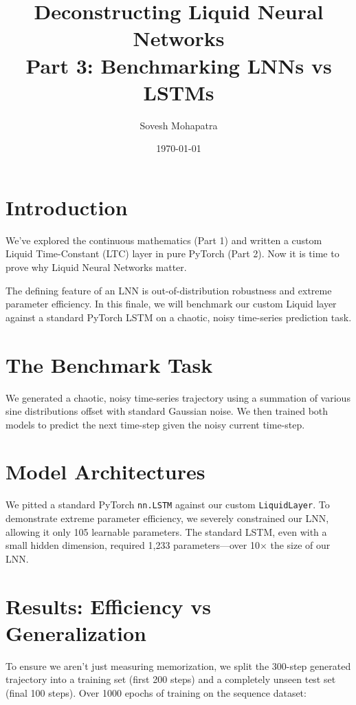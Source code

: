 \documentclass[12pt]{article}
\title{\textbf{Deconstructing Liquid Neural Networks \\ Part 3: Benchmarking LNNs vs LSTMs}}
\author{Sovesh Mohapatra}
\date{\today}
\begin{document}
\maketitle

\section*{Introduction}
We’ve explored the continuous mathematics (Part 1) and written a custom Liquid Time-Constant (LTC) layer in pure PyTorch (Part 2). Now it is time to prove why Liquid Neural Networks matter.

The defining feature of an LNN is out-of-distribution robustness and extreme parameter efficiency. In this finale, we will benchmark our custom Liquid layer against a standard PyTorch LSTM on a chaotic, noisy time-series prediction task.

\section*{The Benchmark Task}
We generated a chaotic, noisy time-series trajectory using a summation of various sine distributions offset with standard Gaussian noise. We then trained both models to predict the next time-step given the noisy current time-step.

\section*{Model Architectures}
We pitted a standard PyTorch \texttt{nn.LSTM} against our custom \texttt{LiquidLayer}. To demonstrate extreme parameter efficiency, we severely constrained our LNN, allowing it only 105 learnable parameters. The standard LSTM, even with a small hidden dimension, required 1,233 parameters—over 10$\times$ the size of our LNN.

\section*{Results: Efficiency vs Generalization}
To ensure we aren't just measuring memorization, we split the 300-step generated trajectory into a training set (first 200 steps) and a completely unseen test set (final 100 steps). Over 1000 epochs of training on the sequence dataset:
\end{document}
